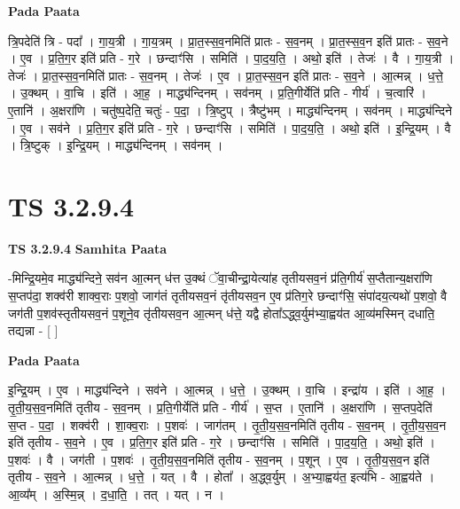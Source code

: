 \documentclass[17pt]{extarticle}
\begin{document}
\textbf{Pada Paata} \newline

त्रि॒पदेति॑ त्रि - पदा᳚ । गा॒य॒त्री । गा॒य॒त्रम् । प्रा॒त॒स्स॒व॒नमिति॑ प्रातः - स॒व॒नम् । प्रा॒त॒स्स॒व॒न इति॑ प्रातः - स॒व॒ने । ए॒व । प्र॒ति॒ग॒र इति॑ प्रति - ग॒रे । छन्दाꣳ॑सि । समिति॑ । पा॒द॒य॒ति॒ । अथो॒ इति॑ । तेजः॑ । वै । गा॒य॒त्री । तेजः॑ । प्रा॒त॒स्स॒व॒नमिति॑ प्रातः - स॒व॒नम् । तेजः॑ । ए॒व । प्रा॒त॒स्स॒व॒न इति॑ प्रातः - स॒व॒ने । आ॒त्मन्न् । ध॒त्ते॒ । उ॒क्थम् । वा॒चि । इति॑ । आ॒ह॒ । माद्ध्य॑न्दिनम् । सव॑नम् । प्र॒ति॒गीर्येति॑ प्रति - गीर्य॑ । च॒त्वारि॑ । ए॒तानि॑ । अ॒क्षरा॑णि । चतु॑ष्प॒देति॒ चतुः॑ - प॒दा॒ । त्रि॒ष्टुप् । त्रैष्टु॑भम् । माद्ध्य॑न्दिनम् । सव॑नम् । माद्ध्य॑न्दिने । ए॒व । सव॑ने । प्र॒ति॒ग॒र इति॑ प्रति - ग॒रे । छन्दाꣳ॑सि । समिति॑ । पा॒द॒य॒ति॒ । अथो॒ इति॑ । इ॒न्द्रि॒यम् । वै । त्रि॒ष्टुक् । इ॒न्द्रि॒यम् । माद्ध्य॑न्दिनम् । सव॑नम् ।  \newline




\section*{ TS 3.2.9.4 }

\textbf{TS 3.2.9.4 } \newline
\textbf{Samhita Paata} \newline

-मिन्द्रि॒यमे॒व माद्ध्य॑न्दिने॒ सव॑न आ॒त्मन् ध॑त्त उ॒क्थं ॅवा॒चीन्द्रा॒येत्या॑ह तृतीयसव॒नं प्र॑ति॒गीर्य॑ स॒प्तैतान्य॒क्षरा॑णि स॒प्तप॑दा॒ शक्व॑री शाक्व॒राः प॒शवो॒ जाग॑तं तृतीयसव॒नं तृ॑तीयसव॒न ए॒व प्र॑तिग॒रे छन्दाꣳ॑सि॒ संपा॑दय॒त्यथो॑ प॒शवो॒ वै जग॑ती प॒शव॑स्तृतीयसव॒नं प॒शूने॒व तृ॑तीयसव॒न आ॒त्मन् ध॑त्ते॒ यद्वै होता᳚ऽद्ध्व॒र्युम॑भ्या॒ह्वय॑त आ॒व्य॑मस्मिन् दधाति॒ तद्यन्ना - [  ] \newline

\textbf{Pada Paata} \newline

इ॒न्द्रि॒यम् । ए॒व । माद्ध्य॑न्दिने । सव॑ने । आ॒त्मन्न् । ध॒त्ते॒ । उ॒क्थम् । वा॒चि । इन्द्रा॑य । इति॑ । आ॒ह॒ । तृ॒ती॒य॒स॒व॒नमिति॑ तृतीय - स॒व॒नम् । प्र॒ति॒गीर्येति॑ प्रति - गीर्य॑ । स॒प्त । ए॒तानि॑ । अ॒क्षरा॑णि । स॒प्तप॒देति॑ स॒प्त - प॒दा॒ । शक्व॑री । शा॒क्व॒राः । प॒शवः॑ । जाग॑तम् । तृ॒ती॒य॒स॒व॒नमिति॑ तृतीय - स॒व॒नम् । तृ॒ती॒य॒स॒व॒न इति॑ तृतीय - स॒व॒ने । ए॒व । प्र॒ति॒ग॒र इति॑ प्रति - ग॒रे । छन्दाꣳ॑सि । समिति॑ । पा॒द॒य॒ति॒ । अथो॒ इति॑ । प॒शवः॑ । वै । जग॑ती । प॒शवः॑ । तृ॒ती॒य॒स॒व॒नमिति॑ तृतीय - स॒व॒नम् । प॒शून् । ए॒व । तृ॒ती॒य॒स॒व॒न इति॑ तृतीय - स॒व॒ने । आ॒त्मन्न् । ध॒त्ते॒ । यत् । वै । होता᳚ । अ॒द्ध्व॒र्युम् । अ॒भ्या॒ह्वय॑त॒ इत्य॑भि - आ॒ह्वय॑ते । आ॒व्य᳚म् । अ॒स्मि॒न्न् । द॒धा॒ति॒ । तत् । यत् । न ।  \newline
\end{document}
